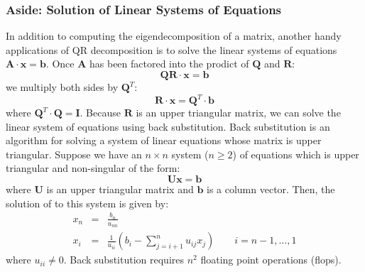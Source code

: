 \documentclass{article}[12pt]
\begin{document}
\subsubsection*{Aside: Solution of Linear Systems of Equations}
In addition to computing the eigendecomposition of a matrix, another handy applications of QR decomposition is to solve the linear systems of equations $\mathbf{A}\cdot\mathbf{x} = \mathbf{b}$.
Once $\mathbf{A}$ has been factored into the prodict of $\mathbf{Q}$ and $\mathbf{R}$:
\begin{equation}
\mathbf{Q}\mathbf{R}\cdot\mathbf{x} = \mathbf{b}
\end{equation}
we multiply both sides by $\mathbf{Q}^{T}$:
\begin{equation}
\mathbf{R}\cdot\mathbf{x} = \mathbf{Q}^{T}\cdot\mathbf{b}
\end{equation}
where $\mathbf{Q}^{T}\cdot\mathbf{Q} = \mathbf{I}$. Because $\mathbf{R}$ is an upper triangular matrix, 
we can solve the linear system of equations using back substitution. Back substitution is an algorithm for solving a system of linear equations whose matrix is upper triangular.
Suppose we have an $n\times{n}$ system ($n\geq{2}$) of equations which is upper triangular and non-singular of the form:
\begin{equation*}
\mathbf{U}\mathbf{x} = \mathbf{b}
\end{equation*}
where $\mathbf{U}$ is an upper triangular matrix and $\mathbf{b}$ is a column vector.
Then, the solution of to this system is given by:
\begin{eqnarray*}
x_{n} & = & \frac{b_{n}}{u_{nn}} \\
x_{i} & = & \frac{1}{u_{ii}}\left(b_{i} - \sum_{j=i+1}^{n}u_{ij}x_{j}\right)\qquad{i=n-1,\dots,1}
\end{eqnarray*}
where $u_{ii}\neq{0}$. Back substitution requires $n^{2}$ floating point operations (flops).
\end{document}
